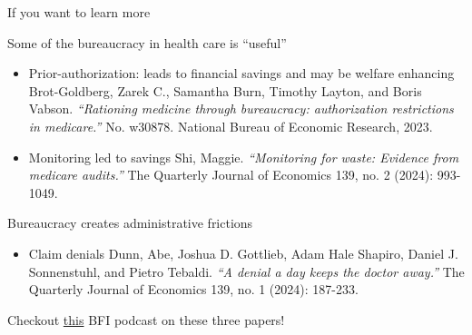 \begin{frame}{If you want to learn more}

Some of the bureaucracy in health care is ``useful''
\begin{itemize}
    \item Prior-authorization: leads to financial savings and may be welfare enhancing\\
    {\scriptsize \color{gray} Brot-Goldberg, Zarek C., Samantha Burn, Timothy Layton, and Boris Vabson. \textit{``Rationing medicine through bureaucracy: authorization restrictions in medicare.''} No. w30878. National Bureau of Economic Research, 2023.
    \color{black}}
    \item Monitoring led to savings
    {\scriptsize \color{gray} Shi, Maggie. \textit{``Monitoring for waste: Evidence from medicare audits.''} The Quarterly Journal of Economics 139, no. 2 (2024): 993-1049.
    \color{black}}
\end{itemize}

Bureaucracy creates administrative frictions
\begin{itemize}
    \item Claim denials
    {\scriptsize \color{gray} Dunn, Abe, Joshua D. Gottlieb, Adam Hale Shapiro, Daniel J. Sonnenstuhl, and Pietro Tebaldi. \textit{``A denial a day keeps the doctor away.''} The Quarterly Journal of Economics 139, no. 1 (2024): 187-233.
    \color{black}}
\end{itemize}

Checkout \href{https://bfi.uchicago.edu/insights/the-economics-of-health-insurance-denials-pre-authorizations-and-cost-control/}{this} BFI podcast on these three papers!
\end{frame}
